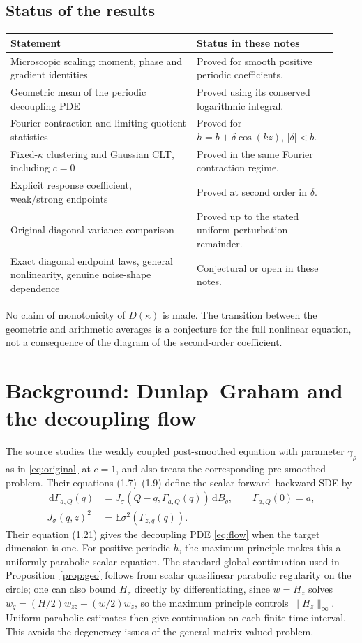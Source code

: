 \documentclass[11pt]{article}
\numberwithin{equation}{section}
\theoremstyle{definition}
\theoremstyle{remark}
\newcommand{\E}{\mathbb E}
\newcommand{\dd}{\,\mathrm d}
\begin{document}
\subsection{Status of the results}
\begin{center}
\renewcommand{\arraystretch}{1.25}
\begin{tabular}{@{}p{0.53\linewidth}p{0.40\linewidth}@{}}
\toprule
Statement & Status in these notes\\\midrule
Microscopic scaling; moment, phase and gradient identities & Proved for smooth positive periodic coefficients.\\
Geometric mean of the periodic decoupling PDE & Proved using its conserved logarithmic integral.\\
Fourier contraction and limiting quotient statistics & Proved for $h=b+\delta\cos(kz)$, $|\delta|<b$.\\
Fixed-$\kappa$ clustering and Gaussian CLT, including $c=0$ & Proved in the same Fourier contraction regime.\\
Explicit response coefficient, weak/strong endpoints & Proved at second order in $\delta$.\\
Original diagonal variance comparison & Proved up to the stated uniform perturbation remainder.\\
Exact diagonal endpoint laws, general nonlinearity, genuine noise-shape dependence & Conjectural or open in these notes.\\\bottomrule
\end{tabular}
\end{center}
No claim of monotonicity of $D(\kappa)$ is made. The transition between the geometric and arithmetic averages is a conjecture for the full nonlinear equation, not a consequence of the diagram of the second-order coefficient.

\appendix
\section{Background: Dunlap--Graham and the decoupling flow}\label{app:DG}
The source \cite{DG} studies the weakly coupled post-smoothed equation with parameter $\gamma_\rho$ as in \eqref{eq:original} at $c=1$, and also treats the corresponding pre-smoothed problem. Their equations (1.7)--(1.9) define the scalar forward--backward SDE by
\begin{align*}
 \dd\Gamma_{a,Q}(q)&=J_\sigma(Q-q,\Gamma_{a,Q}(q))\dd B_q,\qquad\Gamma_{a,Q}(0)=a,\\
 J_\sigma(q,z)^2&=\E\sigma^2(\Gamma_{z,q}(q)).
\end{align*}
Their equation (1.21) gives the decoupling PDE \eqref{eq:flow} when the target dimension is one. For positive periodic $h$, the maximum principle makes this a uniformly parabolic scalar equation. The standard global continuation used in Proposition~\ref{prop:geo} follows from scalar quasilinear parabolic regularity on the circle; one can also bound $H_z$ directly by differentiating, since $w=H_z$ solves $w_q=(H/2)w_{zz}+(w/2)w_z$, so the maximum principle controls $\|H_z\|_\infty$. Uniform parabolic estimates then give continuation on each finite time interval. This avoids the degeneracy issues of the general matrix-valued problem.
\end{document}
